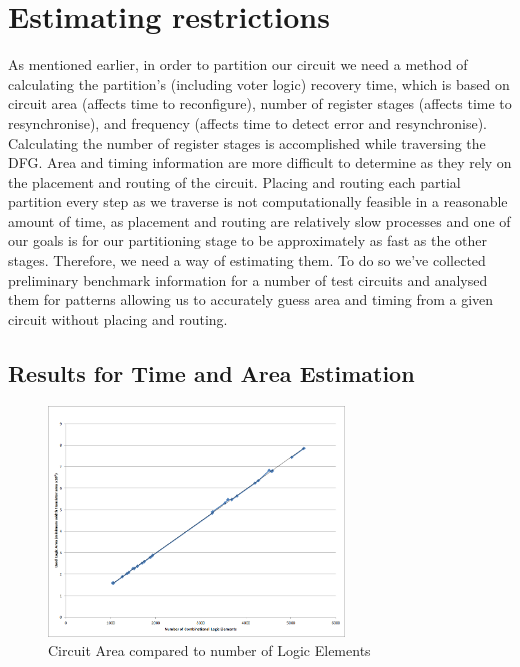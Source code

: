 \documentclass[12pt,final,oneside]{memoir} %
\begin{document}
\section{Estimating restrictions}
As mentioned earlier, in order to partition our circuit we need a method of calculating the partition's (including voter logic) recovery time, which is based on circuit area (affects time to reconfigure), number of register stages (affects time to resynchronise), and frequency (affects time to detect error and resynchronise). Calculating the number of register stages is accomplished while traversing the \ac{DFG}.
Area and timing information are more difficult to determine as they rely on the placement and routing of the circuit. Placing and routing each partial partition every step as we traverse is not computationally feasible in a reasonable amount of time, as placement and routing are relatively slow processes and one of our goals is for our partitioning stage to be approximately as fast as the other stages. Therefore, we need a way of estimating them. To do so we've collected preliminary benchmark information for a number of test circuits and analysed them for patterns allowing us to accurately guess area and timing from a given circuit without placing and routing.

\subsection{Results for Time and Area Estimation}
\begin{figure}
    \begin{center}
        \includegraphics[width=0.7\textwidth]{images/area-v-elements.png}
        \caption{Circuit Area compared to number of Logic Elements}
        \label{AreaVElements}
    \end{center}
\end{figure}
\end{document}
